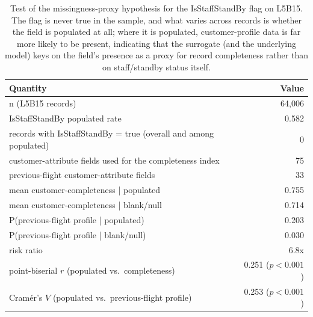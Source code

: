 \begin{table}[ht]
\caption{Test of the missingness-proxy hypothesis for the IsStaffStandBy flag on L5B15. The flag is never true in the sample, and what varies across records is whether the field is populated at all; where it is populated, customer-profile data is far more likely to be present, indicating that the surrogate (and the underlying model) keys on the field's presence as a proxy for record completeness rather than on staff/standby status itself.}
\label{tab:rq5_staffstandby_proxy}
\centering
\begin{tabular}{lr}
\toprule
Quantity & Value \\
\midrule
n (L5B15 records) & 64,006 \\
IsStaffStandBy populated rate & 0.582 \\
records with IsStaffStandBy = true (overall and among populated) & 0 \\
customer-attribute fields used for the completeness index & 75 \\
previous-flight customer-attribute fields & 33 \\
mean customer-completeness | populated & 0.755 \\
mean customer-completeness | blank/null & 0.714 \\
P(previous-flight profile | populated) & 0.203 \\
P(previous-flight profile | blank/null) & 0.030 \\
risk ratio & 6.8x \\
point-biserial $r$ (populated vs.\ completeness) & 0.251 ($p<0.001$) \\
Cramér's $V$ (populated vs.\ previous-flight profile) & 0.253 ($p<0.001$) \\
\bottomrule
\end{tabular}
\end{table}
